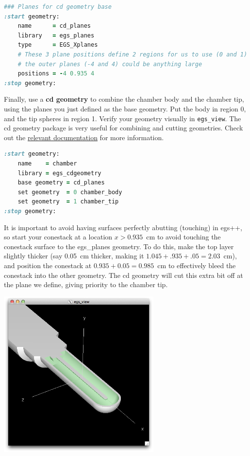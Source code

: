 \documentclass[12pt,twoside]{article}
\begin{document}
{\small
\begin{lstlisting}[language=ruby,backgroundcolor=\color{white}]
### Planes for cd geometry base
:start geometry:
    name      = cd_planes
    library   = egs_planes
    type      = EGS_Xplanes
    # These 3 plane positions define 2 regions for us to use (0 and 1)
    # the outer planes (-4 and 4) could be anything large
    positions = -4 0.935 4
:stop geometry:
\end{lstlisting}
}

Finally, use a \textbf{cd geometry} to combine the chamber body and the chamber
tip, using the planes you just defined as the base geometry. Put the body in
region 0, and the tip spheres in region 1. Verify your geometry visually in
\Verb|egs_view|. The cd geometry package is very useful for combining and
cutting geometries. Check out the
\href{http://nrc-cnrc.github.io/EGSnrc/doc/pirs898/classEGS__CDGeometry.html#details}{relevant documentation}
for more information.

{\small
\begin{lstlisting}[language=ruby,backgroundcolor=\color{white}]
:start geometry:
    name    = chamber
    library = egs_cdgeometry
    base geometry = cd_planes
    set geometry  = 0 chamber_body
    set geometry  = 1 chamber_tip
:stop geometry:
\end{lstlisting}
}

It is important to avoid having surfaces perfectly abutting (touching)
in egs++, so start your cone\-stack at a location $x>0.935$~cm to avoid touching
the conestack surface to the egs\_planes geometry. To do this, make the top layer
slightly thicker (say 0.05~cm thicker, making it
$1.045+.935+.05=2.03$~cm), and position the conestack at
$0.935+0.05=0.985$~cm to effectively bleed the conestack into the other
geometry. The cd geometry will cut this extra bit off at the plane we define,
giving priority to the chamber tip.

\begin{center}
\includegraphics[height=240pt]{figures/a12view}
\end{center}
\end{document}
